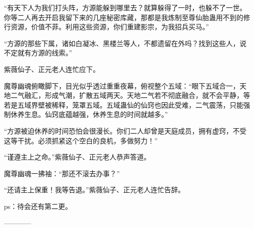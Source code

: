 \begin{this_body}
“有天下人为我们打头阵，方源能躲到哪里去？就算躲得了一时，也躲不了一世。你等二人再去开启我留下来的几座秘密库藏，那都是我炼制至尊仙胎蛊用不到的修行资源，价值不菲。利用这些资源，你们重建影宗，为我招兵买马。”

“方源的那些下属，诸如白凝冰、黑楼兰等人，不都遗留在外吗？找到这些人，说不定就有方源的线索。”

紫薇仙子、正元老人连忙应下。

魔尊幽魂俯瞰脚下，目光似乎透过重重夜幕，俯视整个五域：“眼下五域合一，天地二气融汇，形成气潮，扩散五域两天。天地二气若不彻底融合，就不会平静，等若是五域界壁被稀释，笼罩五域。五域蛊仙的仙窍也因此受难，二气震荡，只能强制休养生息。仙窍底蕴越强，休养生息的时间就越多。”

“方源被迫休养的时间恐怕会很漫长。你们二人却曾是天庭成员，拥有虚窍，不受这等干扰。必须抓紧这个空白的良机，多做努力！”

“谨遵主上之命。”紫薇仙子、正元老人恭声答道。

魔尊幽魂一拂袖：“那还不滚去办事？”

“还请主上保重！我等告退。”紫薇仙子、正元老人连忙告辞。

ps：待会还有第二更。

------------

\end{this_body}

